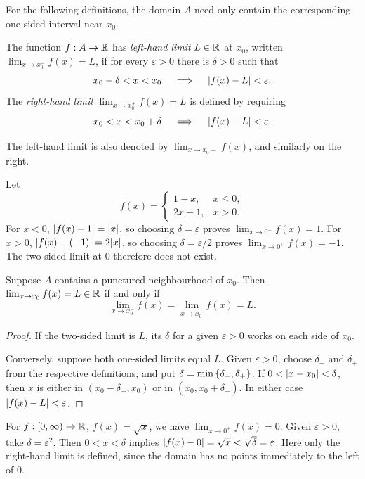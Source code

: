 \documentclass[11pt,a4paper]{amsart}
\begin{document}
For the following definitions, the domain \(A\) need only contain the
corresponding one-sided interval near \(x_0\).

\begin{definition}
  The function \(f:A\to\mathbb{R}\) has \emph{left-hand limit} \(L\in\mathbb{R}\)
  at \(x_0\), written \(\lim_{x\to x_0^-}f(x)=L\), if for every
  \(\varepsilon>0\) there is \(\delta>0\) such that
  \[
    x_0-\delta<x<x_0 \quad\implies\quad \lvert f(x)-L\rvert<\varepsilon.
  \]
  The \emph{right-hand limit} \(\lim_{x\to x_0^+}f(x)=L\) is defined
  by requiring
  \[
    x_0<x<x_0+\delta \quad\implies\quad \lvert f(x)-L\rvert<\varepsilon.
  \]
\end{definition}

The left-hand limit is also denoted by \(\lim_{x\to x_0-}f(x)\), and
similarly on the right.

\begin{example}
  Let
  \[
    f(x)=
    \begin{cases}
      1-x,&x\leq0,\\
      2x-1,&x>0.
    \end{cases}
  \]
  For \(x<0\), \(\lvert f(x)-1\rvert=\lvert x\rvert\), so choosing
  \(\delta=\varepsilon\) proves \(\lim_{x\to0^-}f(x)=1\).
  For \(x>0\), \(\lvert f(x)-(-1)\rvert=2\lvert x\rvert\), so choosing
  \(\delta=\varepsilon/2\) proves
  \(\lim_{x\to0^+}f(x)=-1\). The two-sided limit at \(0\)
  therefore does not exist.
\end{example}

\begin{theorem}\label{thm:one-sided-limits}
  Suppose \(A\) contains a punctured neighbourhood of \(x_0\).
  Then \(\lim_{x\to x_0}f(x)=L\in\mathbb{R}\) if and only if
  \[
    \lim_{x\to x_0^-}f(x)
    =\lim_{x\to x_0^+}f(x)=L.
  \]
\end{theorem}

\begin{proof}
  If the two-sided limit is \(L\), its \(\delta\) for a given
  \(\varepsilon>0\) works on each side of \(x_0\).

  Conversely, suppose both one-sided limits equal \(L\). Given
  \(\varepsilon>0\), choose \(\delta_-\) and \(\delta_+\) from
  the respective definitions, and put
  \(\delta=\min\left\lbrace\delta_-,\delta_+\right\rbrace\). If
  \(0<\lvert x-x_0\rvert<\delta\), then \(x\) is either in
  \((x_0-\delta_-,x_0)\) or in \((x_0,x_0+\delta_+)\).
  In either case \(\lvert f(x)-L\rvert<\varepsilon\).
\end{proof}

\begin{example}
  For \(f:[0,\infty)\to\mathbb{R}\), \(f(x)=\sqrt{x}\), we have
  \(\lim_{x\to0^+}f(x)=0\). Given \(\varepsilon>0\), take
  \(\delta=\varepsilon^2\). Then
  \(0<x<\delta\) implies
  \(\lvert f(x)-0\rvert=\sqrt{x}<\sqrt{\delta}=\varepsilon\).
  Here only the right-hand limit is defined, since the domain has no
  points immediately to the left of \(0\).
\end{example}
\end{document}

